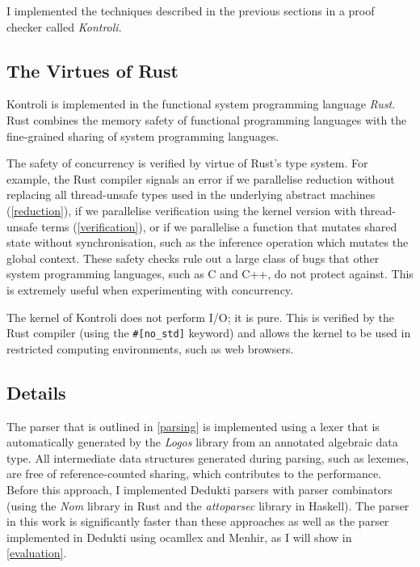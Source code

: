 \documentclass[screen,sigplan,10pt]{acmart}
\begin{document}
I implemented the techniques described in the previous sections in a
proof checker called \emph{Kontroli}.

\hypertarget{the-virtues-of-rust}{%
\subsection{The Virtues of Rust}\label{the-virtues-of-rust}}

Kontroli is implemented in the functional system programming language
\emph{Rust}. Rust combines the memory safety of functional programming
languages with the fine-grained sharing of system programming languages.

The safety of concurrency is verified by virtue of Rust's type system.
For example, the Rust compiler signals an error if we parallelise
reduction without replacing all thread-unsafe types used in the
underlying abstract machines (\autoref{reduction}), if we parallelise
verification using the kernel version with thread-unsafe terms
(\autoref{verification}), or if we parallelise a function that mutates
shared state without synchronisation, such as the inference operation
which mutates the global context. These safety checks rule out a large
class of bugs that other system programming languages, such as C and
C++, do not protect against. This is extremely useful when experimenting
with concurrency.

The kernel of Kontroli does not perform I/O; it is pure. This is
verified by the Rust compiler (using the \texttt{\#{[}no\_std{]}}
keyword) and allows the kernel to be used in restricted computing
environments, such as web browsers.

\hypertarget{details}{%
\subsection{Details}\label{details}}

The parser that is outlined in \autoref{parsing} is implemented using a
lexer that is automatically generated by the \emph{Logos} library from
an annotated algebraic data type. All intermediate data structures
generated during parsing, such as lexemes, are free of reference-counted
sharing, which contributes to the performance. Before this approach, I
implemented Dedukti parsers with parser combinators (using the
\emph{Nom} library in Rust and the \emph{attoparsec} library in
Haskell). The parser in this work is significantly faster than these
approaches as well as the parser implemented in Dedukti using ocamllex
and Menhir, as I will show in \autoref{evaluation}.
\end{document}
